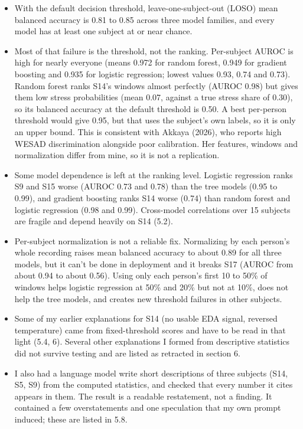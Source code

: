 \documentclass[11pt]{article}
\providecommand{\tightlist}{\setlength{\itemsep}{2pt}\setlength{\parskip}{0pt}}
\begin{document}
\begin{itemize}
\tightlist
\item
  With the default decision threshold, leave-one-subject-out (LOSO) mean
  balanced accuracy is 0.81 to 0.85 across three model families, and
  every model has at least one subject at or near chance.
\item
  Most of that failure is the threshold, not the ranking. Per-subject
  AUROC is high for nearly everyone (means 0.972 for random forest,
  0.949 for gradient boosting and 0.935 for logistic regression; lowest
  values 0.93, 0.74 and 0.73). Random forest ranks S14's windows almost
  perfectly (AUROC 0.98) but gives them low stress probabilities (mean
  0.07, against a true stress share of 0.30), so its balanced accuracy
  at the default threshold is 0.50. A best per-person threshold would
  give 0.95, but that uses the subject's own labels, so it is only an
  upper bound. This is consistent with Akkaya (2026), who reports high
  WESAD discrimination alongside poor calibration. Her features, windows
  and normalization differ from mine, so it is not a replication.
\item
  Some model dependence is left at the ranking level. Logistic
  regression ranks S9 and S15 worse (AUROC 0.73 and 0.78) than the tree
  models (0.95 to 0.99), and gradient boosting ranks S14 worse (0.74)
  than random forest and logistic regression (0.98 and 0.99).
  Cross-model correlations over 15 subjects are fragile and depend
  heavily on S14 (5.2).
\item
  Per-subject normalization is not a reliable fix. Normalizing by each
  person's whole recording raises mean balanced accuracy to about 0.89
  for all three models, but it can't be done in deployment and it breaks
  S17 (AUROC from about 0.94 to about 0.56). Using only each person's
  first 10 to 50\% of windows helps logistic regression at 50\% and 20\%
  but not at 10\%, does not help the tree models, and creates new
  threshold failures in other subjects.
\item
  Some of my earlier explanations for S14 (no usable EDA signal,
  reversed temperature) came from fixed-threshold scores and have to be
  read in that light (5.4, 6). Several other explanations I formed from
  descriptive statistics did not survive testing and are listed as
  retracted in section 6.
\item
  I also had a language model write short descriptions of three subjects
  (S14, S5, S9) from the computed statistics, and checked that every
  number it cites appears in them. The result is a readable restatement,
  not a finding. It contained a few overstatements and one speculation
  that my own prompt induced; these are listed in 5.8.
\end{itemize}
\end{document}
